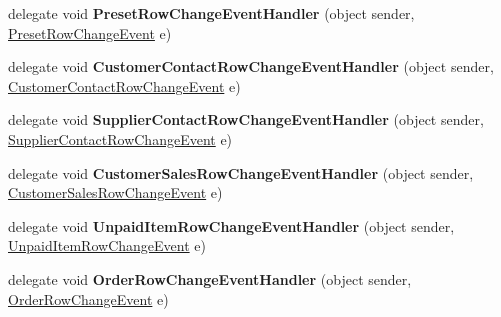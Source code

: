 \begin{DoxyCompactItemize}
\item 
delegate void {\bfseries Preset\+Row\+Change\+Event\+Handler} (object sender, \hyperlink{class_products_1_1_data_1_1ds_sage_1_1_preset_row_change_event}{Preset\+Row\+Change\+Event} e)\hypertarget{class_products_1_1_data_1_1ds_sage_a02ccb067e9397a151f078038015c4d9b}{}\label{class_products_1_1_data_1_1ds_sage_a02ccb067e9397a151f078038015c4d9b}

\item 
delegate void {\bfseries Customer\+Contact\+Row\+Change\+Event\+Handler} (object sender, \hyperlink{class_products_1_1_data_1_1ds_sage_1_1_customer_contact_row_change_event}{Customer\+Contact\+Row\+Change\+Event} e)\hypertarget{class_products_1_1_data_1_1ds_sage_aed1a225a60389154ca2c5e82044c4568}{}\label{class_products_1_1_data_1_1ds_sage_aed1a225a60389154ca2c5e82044c4568}

\item 
delegate void {\bfseries Supplier\+Contact\+Row\+Change\+Event\+Handler} (object sender, \hyperlink{class_products_1_1_data_1_1ds_sage_1_1_supplier_contact_row_change_event}{Supplier\+Contact\+Row\+Change\+Event} e)\hypertarget{class_products_1_1_data_1_1ds_sage_ac98aaa3dc8397597a78e91934e84f2a2}{}\label{class_products_1_1_data_1_1ds_sage_ac98aaa3dc8397597a78e91934e84f2a2}

\item 
delegate void {\bfseries Customer\+Sales\+Row\+Change\+Event\+Handler} (object sender, \hyperlink{class_products_1_1_data_1_1ds_sage_1_1_customer_sales_row_change_event}{Customer\+Sales\+Row\+Change\+Event} e)\hypertarget{class_products_1_1_data_1_1ds_sage_ad8397e8a8fd65259ad36deabdf908c2c}{}\label{class_products_1_1_data_1_1ds_sage_ad8397e8a8fd65259ad36deabdf908c2c}

\item 
delegate void {\bfseries Unpaid\+Item\+Row\+Change\+Event\+Handler} (object sender, \hyperlink{class_products_1_1_data_1_1ds_sage_1_1_unpaid_item_row_change_event}{Unpaid\+Item\+Row\+Change\+Event} e)\hypertarget{class_products_1_1_data_1_1ds_sage_a14502e9b528fb40e0ea21adcfc8f4d31}{}\label{class_products_1_1_data_1_1ds_sage_a14502e9b528fb40e0ea21adcfc8f4d31}

\item 
delegate void {\bfseries Order\+Row\+Change\+Event\+Handler} (object sender, \hyperlink{class_products_1_1_data_1_1ds_sage_1_1_order_row_change_event}{Order\+Row\+Change\+Event} e)\hypertarget{class_products_1_1_data_1_1ds_sage_a0ce411ec138f932c8366a104342320bc}{}\label{class_products_1_1_data_1_1ds_sage_a0ce411ec138f932c8366a104342320bc}


\end{DoxyCompactItemize}
